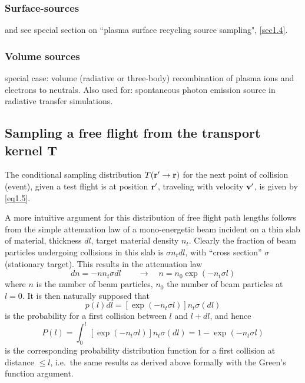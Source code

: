 \subsubsection{Surface-sources}

and see special section on ``plasma surface recycling source sampling",
\cref{sec1.4}.

\subsubsection{Volume sources}

special case: volume (radiative or three-body) recombination of plasma ions and
electrons to neutrals.
Also used for: spontaneous photon emission source in radiative transfer
simulations.

\subsection{Sampling a free flight from the transport kernel T}
\label{sec1.2.3}

The conditional sampling distribution $T(\mathbf{r}'\rightarrow \mathbf{r})$ for the next
point of collision (event), given a test flight is at position $\mathbf{r}'$,
traveling with velocity $\mathbf{v}'$, is given by \cref{eq1.5}.

A more intuitive argument for this distribution of free flight path lengths
follows from the simple attenuation law of a mono-energetic beam incident on a
thin slab of material, thickness $dl$, target material density $n_t$.
Clearly the fraction of beam particles undergoing collisions in this slab is
$\sigma n_t dl$, with ``cross section'' $\sigma$ (stationary target).
This  results in the attenuation law
\begin{equation}
  dn = -n n_t  \sigma dl
  \quad \quad \rightarrow \quad n = n_0 \exp(-n_t \sigma l)
\end{equation}
where
$n$ is the number of beam particles, $n_0$ the number of beam particles at
$l=0$.
It is then naturally supposed that
\begin{equation}
  p(l)dl = [\exp(-n_t\sigma
  l)]n_t\sigma (dl)
\end{equation}
is the probability for a first collision
between $l$ and $l+dl$, and hence
\begin{equation}
  P(l) = \int_0^l
  [\exp(-n_t\sigma l)]n_t\sigma (dl) = 1 - \exp(-n_t \sigma l)
\end{equation}
is
the corresponding probability distribution function for a first collision at
distance $\le l$, i.e.\ the same results as derived above formally with the
Green's function argument.


